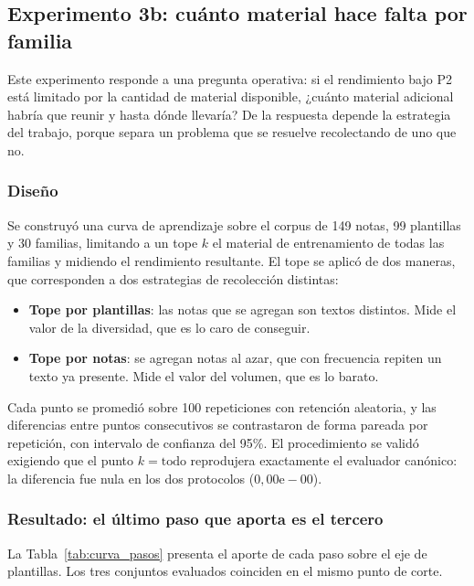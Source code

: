 \subsection{Experimento 3b: cuánto material hace falta por familia}
\label{subsec:res_curva}

Este experimento responde a una pregunta operativa: si el rendimiento bajo P2 está limitado por la cantidad de material disponible, ¿cuánto material adicional habría que reunir y hasta dónde llevaría? De la respuesta depende la estrategia del trabajo, porque separa un problema que se resuelve recolectando de uno que no.

\subsubsection*{Diseño}

Se construyó una curva de aprendizaje sobre el corpus de 149 notas, 99 plantillas y 30 familias, limitando a un tope $k$ el material de entrenamiento de todas las familias y midiendo el rendimiento resultante. El tope se aplicó de dos maneras, que corresponden a dos estrategias de recolección distintas:

\begin{itemize}
  \item \textbf{Tope por plantillas}: las notas que se agregan son textos distintos. Mide el valor de la diversidad, que es lo caro de conseguir.
  \item \textbf{Tope por notas}: se agregan notas al azar, que con frecuencia repiten un texto ya presente. Mide el valor del volumen, que es lo barato.
\end{itemize}

Cada punto se promedió sobre 100 repeticiones con retención aleatoria, y las diferencias entre puntos consecutivos se contrastaron de forma pareada por repetición, con intervalo de confianza del 95\%. El procedimiento se validó exigiendo que el punto $k=\text{todo}$ reprodujera exactamente el evaluador canónico: la diferencia fue nula en los dos protocolos ($0{,}00\mathrm{e}{-}00$).

\subsubsection*{Resultado: el último paso que aporta es el tercero}

La Tabla~\ref{tab:curva_pasos} presenta el aporte de cada paso sobre el eje de plantillas. Los tres conjuntos evaluados coinciden en el mismo punto de corte.

